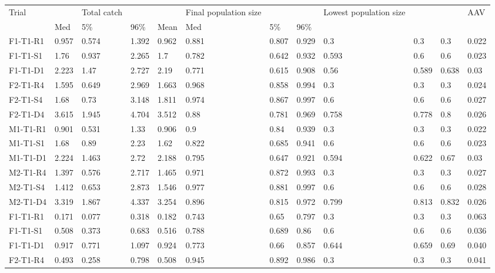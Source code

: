 \begin{table}[ht]
\centering
\begin{tabular}{llllllllllll}
  \hline
  \hline
Trial &  & Total catch &  &  & Final population size &  &  & Lowest population size &  &  & AAV \\ 
   & Med & 5\% & 96\% & Mean & Med & 5\% & 96\% &  &  &  &  \\ 
  F1-T1-R1 & 0.957 & 0.574 & 1.392 & 0.962 & 0.881 & 0.807 & 0.929 & 0.3 & 0.3 & 0.3 & 0.022 \\ 
  F1-T1-S1 & 1.76 & 0.937 & 2.265 & 1.7 & 0.782 & 0.642 & 0.932 & 0.593 & 0.6 & 0.6 & 0.023 \\ 
  F1-T1-D1 & 2.223 & 1.47 & 2.727 & 2.19 & 0.771 & 0.615 & 0.908 & 0.56 & 0.589 & 0.638 & 0.03 \\ 
  F2-T1-R4 & 1.595 & 0.649 & 2.969 & 1.663 & 0.968 & 0.858 & 0.994 & 0.3 & 0.3 & 0.3 & 0.024 \\ 
  F2-T1-S4 & 1.68 & 0.73 & 3.148 & 1.811 & 0.974 & 0.867 & 0.997 & 0.6 & 0.6 & 0.6 & 0.027 \\ 
  F2-T1-D4 & 3.615 & 1.945 & 4.704 & 3.512 & 0.88 & 0.781 & 0.969 & 0.758 & 0.778 & 0.8 & 0.026 \\ 
  M1-T1-R1 & 0.901 & 0.531 & 1.33 & 0.906 & 0.9 & 0.84 & 0.939 & 0.3 & 0.3 & 0.3 & 0.022 \\ 
  M1-T1-S1 & 1.68 & 0.89 & 2.23 & 1.62 & 0.822 & 0.685 & 0.941 & 0.6 & 0.6 & 0.6 & 0.023 \\ 
  M1-T1-D1 & 2.224 & 1.463 & 2.72 & 2.188 & 0.795 & 0.647 & 0.921 & 0.594 & 0.622 & 0.67 & 0.03 \\ 
  M2-T1-R4 & 1.397 & 0.576 & 2.717 & 1.465 & 0.971 & 0.872 & 0.993 & 0.3 & 0.3 & 0.3 & 0.027 \\ 
  M2-T1-S4 & 1.412 & 0.653 & 2.873 & 1.546 & 0.977 & 0.881 & 0.997 & 0.6 & 0.6 & 0.6 & 0.028 \\ 
  M2-T1-D4 & 3.319 & 1.867 & 4.337 & 3.254 & 0.896 & 0.815 & 0.972 & 0.799 & 0.813 & 0.832 & 0.026 \\ 
  F1-T1-R1 & 0.171 & 0.077 & 0.318 & 0.182 & 0.743 & 0.65 & 0.797 & 0.3 & 0.3 & 0.3 &    0.063  \\ 
  F1-T1-S1 & 0.508 & 0.373 & 0.683 & 0.516 & 0.788 & 0.689 & 0.86 & 0.6 & 0.6 & 0.6 &    0.036  \\ 
  F1-T1-D1 & 0.917 & 0.771 & 1.097 & 0.924 & 0.773 & 0.66 & 0.857 & 0.644 & 0.659 & 0.69 &    0.040  \\ 
  F2-T1-R4 & 0.493 & 0.258 & 0.798 & 0.508 & 0.945 & 0.892 & 0.986 & 0.3 & 0.3 & 0.3 &    0.041  \\ 

\end{tabular}
\end{table}
